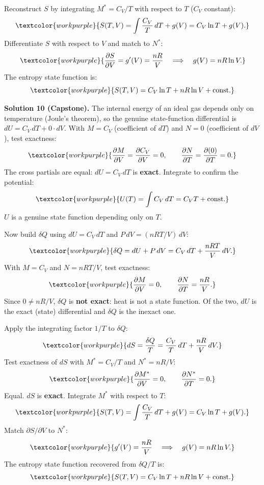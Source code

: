 Reconstruct $S$ by integrating $M^* = C_V/T$ with respect to $T$ ($C_V$
constant):
\[
  \textcolor{workpurple}{S(T,V)
  = \int \frac{C_V}{T}\,dT + g(V)
  = C_V\ln T + g(V).}
\]
Differentiate $S$ with respect to $V$ and match to $N^*$:
\[
  \textcolor{workpurple}{\frac{\partial S}{\partial V}
  = g'(V)
  = \frac{nR}{V}
  \quad\Longrightarrow\quad
  g(V) = nR\ln V.}
\]
The entropy state function is:
\[
  \textcolor{workpurple}{S(T,V) = C_V\ln T + nR\ln V + \text{const.}}
\]

\medskip

\noindent\textbf{Solution 10 (Capstone).}\quad
The internal energy of an ideal gas depends only on temperature (Joule's
theorem), so the genuine state-function differential is
$dU = C_V\,dT + 0\cdot dV$. With $M = C_V$ (coefficient of $dT$) and
$N = 0$ (coefficient of $dV$), test exactness:
\[
  \textcolor{workpurple}{\frac{\partial M}{\partial V}
  = \frac{\partial C_V}{\partial V}
  = 0,
  \qquad
  \frac{\partial N}{\partial T}
  = \frac{\partial (0)}{\partial T}
  = 0.}
\]
The cross partials are equal: $dU = C_V\,dT$ is \textbf{exact}. Integrate to
confirm the potential:
\[
  \textcolor{workpurple}{U(T) = \int C_V\,dT = C_V T + \text{const.}}
\]
$U$ is a genuine state function depending only on $T$.

Now build $\delta Q$ using $dU = C_V\,dT$ and $P\,dV = (nRT/V)\,dV$:
\[
  \textcolor{workpurple}{\delta Q = dU + P\,dV
  = C_V\,dT + \frac{nRT}{V}\,dV.}
\]
With $M = C_V$ and $N = nRT/V$, test exactness:
\[
  \textcolor{workpurple}{\frac{\partial M}{\partial V}
  = 0,
  \qquad
  \frac{\partial N}{\partial T}
  = \frac{nR}{V}.}
\]
Since $0 \neq nR/V$, $\delta Q$ is \textbf{not exact}: heat is not a state
function. Of the two, $dU$ is the exact (state) differential and $\delta Q$
is the inexact one.

Apply the integrating factor $1/T$ to $\delta Q$:
\[
  \textcolor{workpurple}{dS
  = \frac{\delta Q}{T}
  = \frac{C_V}{T}\,dT + \frac{nR}{V}\,dV.}
\]
Test exactness of $dS$ with $M^* = C_V/T$ and $N^* = nR/V$:
\[
  \textcolor{workpurple}{\frac{\partial M^*}{\partial V}
  = 0,
  \qquad
  \frac{\partial N^*}{\partial T}
  = 0.}
\]
Equal. $dS$ is \textbf{exact}. Integrate $M^*$ with respect to $T$:
\[
  \textcolor{workpurple}{S(T,V)
  = \int\frac{C_V}{T}\,dT + g(V)
  = C_V\ln T + g(V).}
\]
Match $\partial S/\partial V$ to $N^*$:
\[
  \textcolor{workpurple}{g'(V)
  = \frac{nR}{V}
  \quad\Longrightarrow\quad
  g(V) = nR\ln V.}
\]
The entropy state function recovered from $\delta Q/T$ is:
\[
  \textcolor{workpurple}{S(T,V)
  = C_V\ln T + nR\ln V + \text{const.}}
\]

